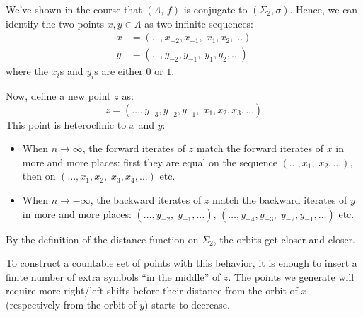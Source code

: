 \begin{problem}
We've shown in the course that \(\left(\Lambda, \, f\right)\) is conjugate to \(\left(\Sigma_{2}, \sigma\right)\). Hence, we can identify the two points \(x, y \in \Lambda\) as two infinite sequences:
\begin{align*}
    x &= \left(\dots, x_{-2}, x_{-1}, \; x_1, x_2, \dots\right) \\
    y &= \left(\dots, y_{-2}, y_{-1}, \; y_1, y_2, \dots\right)
\end{align*}
where the \(x_i\)s and \(y_i\)s are either \(0\) or \(1\). 

Now, define a new point \(z\) as:
\[
    z = \left(\dots, y_{-3}, y_{-2}, y_{-1}, \; x_1, x_2, x_3, \dots\right)
\]
This point is heteroclinic to \(x\) and \(y\):
\begin{itemize}
    \item When \(n \to \infty\), the forward iterates of \(z\) match the forward iterates of \(x\) in more and more places: first they are equal on the sequence \(\left(\dots, x_1, \; x_2, \dots\right)\), then on \(\left(\dots, x_1, x_2, \; x_3, x_4, \dots\right)\) etc.

    \item When \(n \to -\infty\), the backward iterates of \(z\) match the backward iterates of \(y\) in more and more places: \(\left(\dots, y_{-2}, \; y_{-1}, \dots\right)\), \(\left(\dots, y_{-4}, y_{-3}, \; y_{-2}, y_{-1}, \dots\right)\) etc.
\end{itemize}
By the definition of the distance function on \(\Sigma_{2}\), the orbits get closer and closer.

To construct a countable set of points with this behavior, it is enough to insert a finite number of extra symbols ``in the middle'' of \(z\). The points we generate will require more right/left shifts before their distance from the orbit of \(x\) (respectively from the orbit of \(y\)) starts to decrease.
\end{problem}

